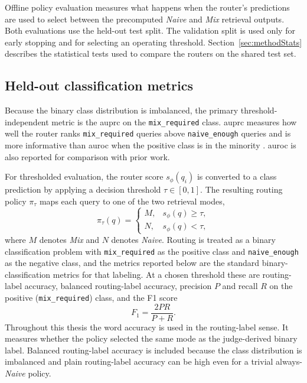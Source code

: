 \documentclass[english, bibtex]{kththesis}               %
\numberwithin{listing}{chapter}
\providecommand{\DIFaddtex}[1]{{\protect\color{blue} \sf #1}} %
\providecommand{\DIFaddbegin}{} %
\providecommand{\DIFaddend}{} %
\providecommand{\DIFadd}[1]{\texorpdfstring{\DIFaddtex{#1}}{#1}} %
\begin{document}
Offline policy evaluation measures what happens when the router's predictions are used to select between the precomputed \emph{Naive} and \emph{Mix} retrieval outputs. Both evaluations use the held-out test split. The validation split is used only for early stopping and for selecting an operating threshold. \DIFaddbegin \DIFadd{Section~\ref{sec:methodStats} describes the statistical tests used to compare the routers on the shared test set.
}\DIFaddend 

\subsection{Held-out classification metrics}
\label{sec:methodHeldOut}

Because the binary class distribution is imbalanced, the primary threshold-independent metric is the \gls{auprc} on the \texttt{mix\_required} class. \Gls{auprc} measures how well the router ranks \texttt{mix\_required} queries above \texttt{naive\_enough} queries and is more informative than \gls{auroc} when the positive class is in the minority \cite{saito2015precision}. \Gls{auroc} is also reported for comparison with prior work.

For thresholded evaluation, the router score \(s_\phi(q_i)\) is converted to a class prediction by applying a decision threshold \(\tau \in [0, 1]\). The resulting routing policy \(\pi_\tau\) maps each query to one of the two retrieval modes,
\begin{equation}
\label{eq:routingPolicy}
\pi_\tau(q) =
\begin{cases}
M, & s_\phi(q) \geq \tau,\\
N, & s_\phi(q) < \tau,
\end{cases}
\end{equation}
where \(M\) denotes \emph{Mix} and \(N\) denotes \emph{Naive}. Routing is treated as a binary classification problem with \texttt{mix\_required} as the positive class and \texttt{naive\_enough} as the negative class, and the metrics reported below are the standard binary-classification metrics for that labeling. At a chosen threshold these are routing-label accuracy, balanced routing-label accuracy, precision \(P\) and recall \(R\) on the positive (\texttt{mix\_required}) class, and the F1 score
\begin{equation}
\label{eq:f1}
F_1 = \frac{2 P R}{P + R}.
\end{equation}
Throughout this thesis the word accuracy is used in the routing-label sense. It measures whether the policy selected the same mode as the judge-derived binary label. Balanced routing-label accuracy is included because the class distribution is imbalanced and plain routing-label accuracy can be high even for a trivial always-\emph{Naive} policy.
\end{document}
